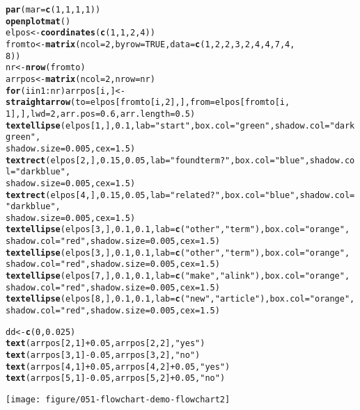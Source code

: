 \documentclass{article}\usepackage[]{graphicx}\usepackage[]{color}
\makeatletter
\def\maxwidth{ %
  \ifdim\Gin@nat@width>\linewidth
    \linewidth
  \else
    \Gin@nat@width
  \fi
}
\newcommand{\hlfunctioncall}[1]{\textcolor[rgb]{0.501960784313725,0,0.329411764705882}{\textbf{#1}}}%
\newcommand{\hlstring}[1]{\textcolor[rgb]{0.6,0.6,1}{#1}}%
\newenvironment{kframe}{%
 \def\at@end@of@kframe{}%
 \ifinner\ifhmode%
  \def\at@end@of@kframe{\end{minipage}}%
  \begin{minipage}{\columnwidth}%
 \fi\fi%
 \def\FrameCommand##1{\hskip\@totalleftmargin \hskip-\fboxsep
 \colorbox{shadecolor}{##1}\hskip-\fboxsep
     \hskip-\linewidth \hskip-\@totalleftmargin \hskip\columnwidth}%
 \MakeFramed {\advance\hsize-\width
   \@totalleftmargin\z@ \linewidth\hsize
   \@setminipage}}%
 {\par\unskip\endMakeFramed%
 \at@end@of@kframe}
\newenvironment{knitrout}{}{} %
\makeatother
\begin{document}
\begin{knitrout}
\begin{kframe}
\begin{alltt}
\hlfunctioncall{par}(mar = \hlfunctioncall{c}(1, 1, 1, 1))
\hlfunctioncall{openplotmat}()
elpos <- \hlfunctioncall{coordinates}(\hlfunctioncall{c}(1, 1, 2, 4))
fromto <- \hlfunctioncall{matrix}(ncol = 2, byrow = TRUE, data = \hlfunctioncall{c}(1, 2, 2, 3, 2, 4, 4, 7, 4, 
    8))
nr <- \hlfunctioncall{nrow}(fromto)
arrpos <- \hlfunctioncall{matrix}(ncol = 2, nrow = nr)
\hlfunctioncall{for} (i in 1:nr) arrpos[i, ] <- \hlfunctioncall{straightarrow}(to = elpos[fromto[i, 2], ], from = elpos[fromto[i, 
    1], ], lwd = 2, arr.pos = 0.6, arr.length = 0.5)
\hlfunctioncall{textellipse}(elpos[1, ], 0.1, lab = \hlstring{"start"}, box.col = \hlstring{"green"}, shadow.col = \hlstring{"darkgreen"}, 
    shadow.size = 0.005, cex = 1.5)
\hlfunctioncall{textrect}(elpos[2, ], 0.15, 0.05, lab = \hlstring{"found term?"}, box.col = \hlstring{"blue"}, shadow.col = \hlstring{"darkblue"}, 
    shadow.size = 0.005, cex = 1.5)
\hlfunctioncall{textrect}(elpos[4, ], 0.15, 0.05, lab = \hlstring{"related?"}, box.col = \hlstring{"blue"}, shadow.col = \hlstring{"darkblue"}, 
    shadow.size = 0.005, cex = 1.5)
\hlfunctioncall{textellipse}(elpos[3, ], 0.1, 0.1, lab = \hlfunctioncall{c}(\hlstring{"other"}, \hlstring{"term"}), box.col = \hlstring{"orange"}, 
    shadow.col = \hlstring{"red"}, shadow.size = 0.005, cex = 1.5)
\hlfunctioncall{textellipse}(elpos[3, ], 0.1, 0.1, lab = \hlfunctioncall{c}(\hlstring{"other"}, \hlstring{"term"}), box.col = \hlstring{"orange"}, 
    shadow.col = \hlstring{"red"}, shadow.size = 0.005, cex = 1.5)
\hlfunctioncall{textellipse}(elpos[7, ], 0.1, 0.1, lab = \hlfunctioncall{c}(\hlstring{"make"}, \hlstring{"a link"}), box.col = \hlstring{"orange"}, 
    shadow.col = \hlstring{"red"}, shadow.size = 0.005, cex = 1.5)
\hlfunctioncall{textellipse}(elpos[8, ], 0.1, 0.1, lab = \hlfunctioncall{c}(\hlstring{"new"}, \hlstring{"article"}), box.col = \hlstring{"orange"}, 
    shadow.col = \hlstring{"red"}, shadow.size = 0.005, cex = 1.5)

dd <- \hlfunctioncall{c}(0, 0.025)
\hlfunctioncall{text}(arrpos[2, 1] + 0.05, arrpos[2, 2], \hlstring{"yes"})
\hlfunctioncall{text}(arrpos[3, 1] - 0.05, arrpos[3, 2], \hlstring{"no"})
\hlfunctioncall{text}(arrpos[4, 1] + 0.05, arrpos[4, 2] + 0.05, \hlstring{"yes"})
\hlfunctioncall{text}(arrpos[5, 1] - 0.05, arrpos[5, 2] + 0.05, \hlstring{"no"})
\end{alltt}
\end{kframe}
\texttt{[image: figure/051-flowchart-demo-flowchart2]} 
\begin{kframe}\begin{alltt}



\end{alltt}
\end{kframe}
\end{knitrout}
\end{document}
